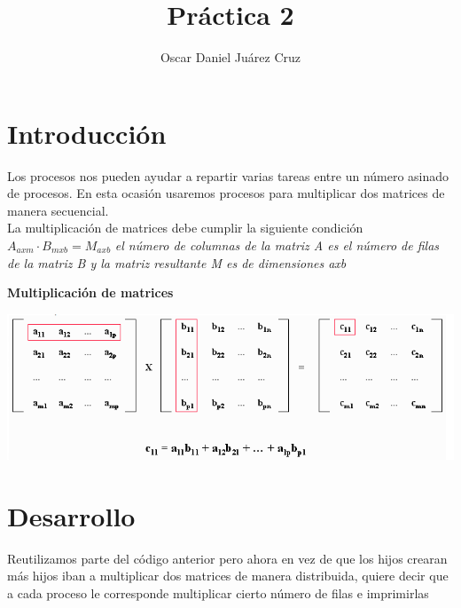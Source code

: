 \documentclass[10pt,a4paper]{article}
\author{Oscar Daniel Juárez Cruz}
\title{Práctica 2}
\begin{document}
\maketitle
\section{Introducción}

\begin{flushleft}

Los procesos nos pueden ayudar a repartir varias tareas entre un número asinado de procesos. En esta ocasión usaremos procesos para multiplicar dos matrices de manera secuencial. \\ 
La multiplicación de matrices debe cumplir la siguiente condición \\ 
$ A_{axm} \cdot B_{mxb}  = M_{axb}$ \textit{el número de columnas de la matriz A es el número de filas de la matriz B y la matriz resultante M es de dimensiones axb}

\end{flushleft}

\begin{center}

\textbf{Multiplicación de matrices}

\end{center}

\begin{center}
	\includegraphics[scale=0.5]{mul.png}
\end{center}

\section{Desarrollo}

\begin{flushleft}
Reutilizamos parte del código anterior pero ahora en vez de que los hijos crearan más hijos iban a multiplicar dos matrices de manera distribuida, quiere decir que a cada proceso le corresponde multiplicar cierto número de filas e imprimirlas
\end{flushleft}
\end{document}

